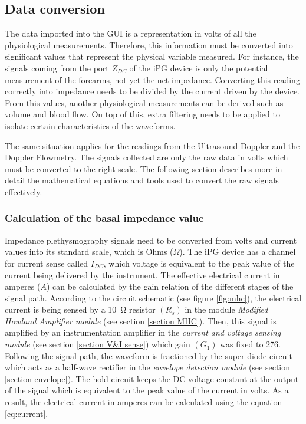 \subsection{Data conversion}
\label{section procedure 2.1}
The data imported into the GUI is a representation in volts of all the physiological measurements. Therefore, this information must be converted into significant values that represent the physical variable measured. For instance, the signals coming from the port $Z_{DC}$ of the iPG device is only the potential measurement of the forearms, not yet the net impedance. Converting this reading correctly into impedance needs to be divided by the current driven by the device. From this values, another physiological measurements can be derived such as volume and blood flow. On top of this, extra filtering needs to be applied to isolate certain characteristics of the waveforms. 

The same situation applies for the readings from the Ultrasound Doppler and the Doppler Flowmetry. The signals collected are only the raw data in volts which must be converted to the right scale. The following section describes more in detail the mathematical equations and tools used to convert the raw signals effectively.  

\subsubsection{Calculation of the basal impedance value}
Impedance plethysmography signals need to be converted from volts and current values into its standard scale, which is Ohms ($\Omega$). The iPG device has a channel for current sense called $I_{DC}$, which voltage is equivalent to the peak value of the current being delivered by the instrument. The effective electrical current in amperes ($A$) can be calculated by the gain relation of the different stages of the signal path. According to the circuit schematic (see figure \ref{fig:mhc}), the electrical current is being sensed by a \SI{10}{\ohm} resistor $(R_s)$ in the module \textit{Modified Howland Amplifier module} (see section \ref{section MHC}). Then, this signal is amplified by an instrumentation amplifier in the \textit{current and voltage sensing module} (see section \ref{section V&I sense}) which gain $(G_1)$ was fixed to \num{276}. Following the signal path, the waveform is fractioned by the super-diode circuit which acts as a half-wave rectifier in the \textit{envelope detection module} (see section \ref{section envelope}). The hold circuit keeps the DC voltage constant at the output of the signal which is equivalent to the peak value of the current in volts. As a result, the electrical current in amperes can be calculated using the equation \ref{eq:current}.

